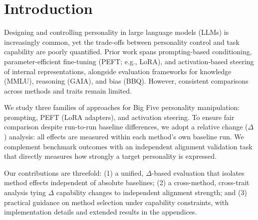 \section{Introduction}

Designing and controlling personality in large language models (LLMs) is increasingly common, yet the trade-offs between personality control and task capability are poorly quantified. Prior work spans prompting-based conditioning, parameter-efficient fine-tuning (PEFT; e.g., LoRA), and activation-based steering of internal representations, alongside evaluation frameworks for knowledge (MMLU), reasoning (GAIA), and bias (BBQ). However, consistent comparisons across methods and traits remain limited.

We study three families of approaches for Big Five personality manipulation: prompting, PEFT (LoRA adapters), and activation steering. To ensure fair comparison despite run-to-run baseline differences, we adopt a relative change (\(\Delta\)) analysis: all effects are measured within each method's own baseline run. We complement benchmark outcomes with an independent alignment validation task that directly measures how strongly a target personality is expressed.

Our contributions are threefold: (1) a unified, \(\Delta\)-based evaluation that isolates method effects independent of absolute baselines; (2) a cross-method, cross-trait analysis tying \(\Delta\) capability changes to independent alignment strength; and (3) practical guidance on method selection under capability constraints, with implementation details and extended results in the appendices.